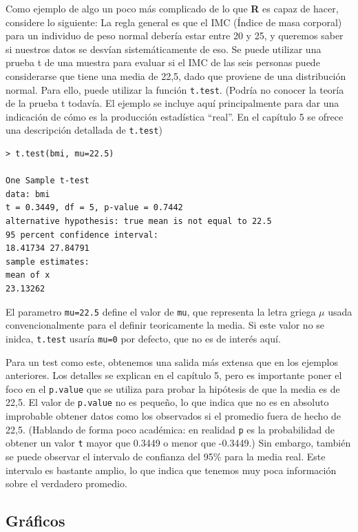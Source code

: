 \documentclass[spanish]{extbook}
\numberwithin{equation}{section}
\numberwithin{figure}{section}
\begin{document}
Como ejemplo de algo un poco más complicado de lo que \textbf{R} es capaz de
hacer, considere lo siguiente: La regla general es que el IMC (Índice de masa
corporal) para un individuo de peso normal debería estar entre 20 y 25, y
queremos saber si nuestros datos se desvían sistemáticamente de eso. Se puede
utilizar una prueba t de una muestra para evaluar si el IMC de las seis
personas puede considerarse que tiene una media de 22,5, dado que proviene de
una distribución normal. Para ello, puede utilizar la función \texttt{t.test}. (Podría
no conocer la teoría de la prueba t todavía. El ejemplo se incluye aquí
principalmente para dar una indicación de cómo es la producción estadística
``real''. En el capítulo 5 se ofrece una descripción detallada de \texttt{t.test})

\begin{lstlisting}[style=R]
> t.test(bmi, mu=22.5)

One Sample t-test
data: bmi
t = 0.3449, df = 5, p-value = 0.7442
alternative hypothesis: true mean is not equal to 22.5
95 percent confidence interval:
18.41734 27.84791
sample estimates:
mean of x
23.13262
\end{lstlisting}

El parametro \texttt{mu=22.5} define el valor de \texttt{mu}, que representa la
letra griega $\mu$ usada convencionalmente para el definir teoricamente la
media. Si este valor no se inidca, \texttt{t.test} usaría  \texttt{mu=0} por
defecto, que no es de interés aquí.  

Para un test como este, obtenemos una salida más extensa que en los ejemplos
anteriores. Los detalles se explican en el capítulo 5, pero es importante poner
el foco en el \texttt{p.value} que se utiliza para probar la hipótesis de que
la media es de 22,5. El valor de \texttt{p.value} no es pequeño, lo que indica
que no es en absoluto improbable obtener datos como los observados si el
promedio fuera de hecho de 22,5. (Hablando de forma poco académica: en realidad
\texttt{p} es la probabilidad de obtener un valor \texttt{t} mayor que 0.3449 o
menor que -0.3449.) Sin embargo, también se puede observar el intervalo de
confianza del 95\% para la media real. Este intervalo es bastante amplio, lo que
indica que tenemos muy poca información sobre el verdadero promedio.
\newpage

\subsection{Gráficos}
\end{document}
